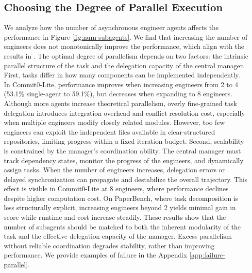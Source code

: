 \subsection{Choosing the Degree of Parallel Execution}

We analyze how the number of asynchronous engineer agents affects the performance in Figure \ref{fig:num-subagents}. We find that increasing the number of engineers does not monotonically improve the performance, which align with the results in \citep{yang2026understanding}. The optimal degree of parallelism depends on two factors: the intrinsic parallel structure of the task and the delegation capacity of the central manager. First, tasks differ in how many components can be implemented independently. In Commit0-Lite, performance improves when increasing engineers from 2 to 4 (53.1\% single-agent to 59.1\%), but decreases when expanding to 8 engineers. Although more agents increase theoretical parallelism, overly fine-grained task delegation introduces integration overhead and conflict resolution cost, especially when multiple engineers modify closely related modules. However, too few engineers can exploit the independent files available in clear-structured repositories, limiting progress within a fixed iteration budget. Second, scalability is constrained by the manager's coordination ability. The central manager must track dependency states, monitor the progress of the engineers, and dynamically assign tasks. When the number of engineers increases, delegation errors or delayed synchronization can propagate and destabilize the overall trajectory. This effect is visible in Commit0-Lite at 8 engineers, where performance declines despite higher computation cost. On PaperBench, where task decomposition is less structurally explicit, increasing engineers beyond 2 yields minimal gain in score while runtime and cost increase steadily. These results show that the number of subagents should be matched to both the inherent modularity of the task and the effective delegation capacity of the manager. Excess parallelism without reliable coordination degrades stability, rather than improving performance. We provide examples of failure in the Appendix \ref{app:failure-parallel}. 

